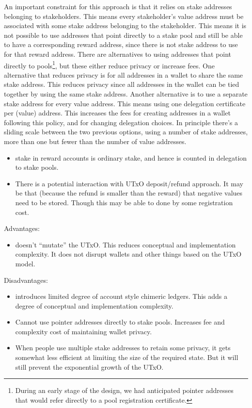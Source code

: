 \documentclass[11pt,a4paper,dvipsnames,twosided]{article}
\begin{document}
An important constraint for this approach is that it relies on stake
addresses belonging to stakeholders. This means every stakeholder's value address
must be associated with some stake address belonging to the stakeholder.
This means it is not possible to use addresses that point directly to a
stake pool and still be able to have a corresponding reward address,
since there is not stake address to use for that reward address. There are
alternatives to using addresses that point directly to pools\footnote{During an
  early stage of the design, we had anticipated pointer addresses that would
  refer directly to a pool registration certificate.}, but these
either reduce privacy or increase fees. One alternative that reduces
privacy is for all addresses in a wallet to share the same stake address.
This reduces privacy since all addresses in the wallet
can be tied together by using the same stake address. Another alternative is
to use a separate stake address for every value address. This means using one
delegation certificate per (value) address. This increases the fees for creating
addresses in a wallet following this policy, and for changing delegation
choices. In principle there's a sliding scale between the two previous
options, using a number of stake addresses, more than one but fewer than the
number of value addresses.

\begin{itemize}
\item
  stake in reward accounts is ordinary stake, and hence is counted in
  delegation to stake pools.
\item
  There is a potential interaction with UTxO deposit/refund approach. It
  may be that (because the refund is smaller than the reward) that
  negative values need to be stored. Though this may be able to done by
  some registration cost.
\end{itemize}

Advantages:

\begin{itemize}
\item
  doesn't ``mutate'' the UTxO. This reduces conceptual and
  implementation complexity. It does not disrupt wallets and other
  things based on the UTxO model.
\end{itemize}

Disadvantages:

\begin{itemize}
\item
  introduces limited degree of account style chimeric ledgers. This adds
  a degree of conceptual and implementation complexity.
\item
  Cannot use pointer addresses directly to stake pools. Increases fee
  and complexity cost of maintaining wallet privacy.
\item
  When people use multiple stake addresses to retain some privacy, it gets
  somewhat less efficient at limiting the size of the required state. But it will
  still prevent the exponential growth of the UTxO.
\end{itemize}
\end{document}
